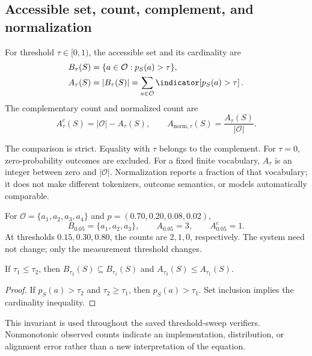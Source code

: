 \subsection{Accessible set, count, complement, and normalization}
\begin{definition}
For threshold $\tau\in[0,1)$, the accessible set and its cardinality are
\begin{align}
B_\tau(S)&=\{a\in\mathcal O:p_S(a)>\tau\},\label{eq:accessible-set}\\
A_\tau(S)&=|B_\tau(S)|
=\sum_{a\in\mathcal O}\indicator\!\left[p_S(a)>\tau\right].
\label{eq:accessible-volume}
\end{align}
The complementary count and normalized count are
\begin{equation}
A^c_\tau(S)=|\mathcal O|-A_\tau(S),\qquad
A_{\mathrm{norm},\tau}(S)=\frac{A_\tau(S)}{|\mathcal O|}.
\label{eq:complement-normalized}
\end{equation}
\end{definition}

The comparison is strict. Equality with $\tau$ belongs to the complement. For $\tau=0$, zero-probability outcomes are excluded. For a fixed finite vocabulary, $A_\tau$ is an integer between zero and $|\mathcal O|$. Normalization reports a fraction of that vocabulary; it does not make different tokenizers, outcome semantics, or models automatically comparable.

\begin{example}
For $\mathcal O=\{a_1,a_2,a_3,a_4\}$ and
$p=(0.70,0.20,0.08,0.02)$,
\begin{equation}
B_{0.05}=\{a_1,a_2,a_3\},\qquad A_{0.05}=3,\qquad A^c_{0.05}=1.
\end{equation}
At thresholds $0.15,0.30,0.80$, the counts are $2,1,0$, respectively. The system need not change; only the measurement threshold changes.
\end{example}

\begin{proposition}
If $\tau_1\leq\tau_2$, then $B_{\tau_2}(S)\subseteq B_{\tau_1}(S)$ and
$A_{\tau_2}(S)\leq A_{\tau_1}(S)$.
\end{proposition}
\begin{proof}
If $p_S(a)>\tau_2$ and $\tau_2\geq\tau_1$, then $p_S(a)>\tau_1$. Set inclusion implies the cardinality inequality.
\end{proof}
This invariant is used throughout the saved threshold-sweep verifiers. Nonmonotonic observed counts indicate an implementation, distribution, or alignment error rather than a new interpretation of the equation.

